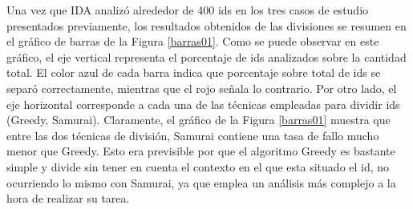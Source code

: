 Una vez que IDA analizó alrededor de 400 ids en los tres casos de estudio presentados previamente, los resultados obtenidos de las divisiones se resumen en el gráfico de barras de la Figura \ref{barras01}. Como se puede observar en este gráfico, el eje vertical representa el porcentaje de ids analizados sobre la cantidad total. El color azul de cada barra indica que porcentaje sobre total de ids se separó correctamente, mientras que el rojo señala lo contrario. Por otro lado, el eje horizontal corresponde a cada una de las técnicas empleadas para dividir ids (Greedy, Samurai).
Claramente, el gráfico de la Figura \ref{barras01} muestra que entre las dos técnicas de división, Samurai contiene una tasa de fallo mucho menor que Greedy. Esto era previsible por que el algoritmo Greedy es bastante simple y divide sin tener en cuenta el contexto en el que esta situado el id, no ocurriendo lo mismo con Samurai, ya que emplea un análisis más complejo a la hora de realizar su tarea.

